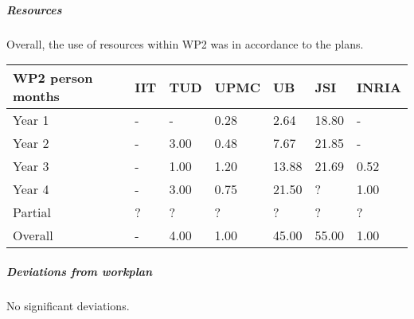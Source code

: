 \subparagraph*{Resources}
Overall, the use of resources within WP2 was in accordance to the plans. 

\begin{center}
\begin{tabular}{|C{1.5cm}|C{1.5cm}|C{1.5cm}|C{2cm}|C{2cm}|C{2cm}|C{2cm}|}
\hline
\footnotesize \textbf{WP2 person months}& \footnotesize \textbf{IIT}&\footnotesize \textbf{TUD}&\footnotesize \textbf{UPMC}& \footnotesize \textbf{UB} &\footnotesize \textbf{JSI} & \footnotesize \textbf{INRIA} \\ \hline
\footnotesize Year 1  &  -     & -    & 0.28 & 2.64  & 18.80  & -     \\  \hline
\footnotesize Year 2  &  -     & 3.00 & 0.48 & 7.67  & 21.85  & -     \\  \hline
\footnotesize Year 3  &  -     & 1.00 & 1.20 & 13.88 & 21.69  & 0.52  \\  \hline
\footnotesize Year 4  &  -     & 3.00 & 0.75 & 21.50 & ?      & 1.00  \\  \hline 
\footnotesize Partial & ?      & ?    & ?    & ?     & ?      & ?     \\
\hline \hline
\footnotesize Overall & -      & 4.00 & 1.00 & 45.00  & 55.00 & 1.00  \\  \hline
\end{tabular}
\end{center}

\subparagraph*{Deviations from workplan} 
No significant deviations.
